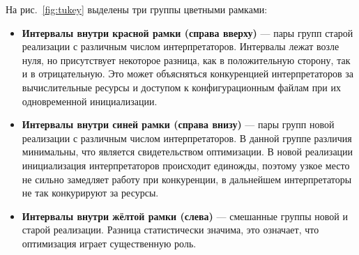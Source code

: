 На рис.~\ref{fig:tukey} выделены три группы цветными рамками:
\begin{itemize}
    \item \textbf{Интервалы внутри красной рамки (справа вверху)} ---
        пары групп старой реализации с различным числом интерпретаторов.
        Интервалы лежат возле нуля, но присутствует
        некоторое разница, как в положительную сторону,
        так и в отрицательную. Это может объясняться
        конкуренцией интерпретаторов
        за вычислительные ресурсы и доступом к конфигурационным файлам
        при их одновременной инициализации.
    \item \textbf{Интервалы внутри синей рамки (справа внизу)} ---
        пары групп новой реализации с различным числом интерпретаторов.
        В данной группе различия минимальны,
        что является свидетельством оптимизации.
        В новой реализации инициализация интерпретаторов
        происходит единожды, поэтому
        узкое место не сильно замедляет работу
        при конкуренции, в дальнейшем
        интерпретаторы не так конкурируют за ресурсы.
    \item \textbf{Интервалы внутри жёлтой рамки (слева)} ---
        смешанные группы новой и старой реализации.
        Разница статистически значима,
        это означает, что оптимизация играет существенную роль.
\end{itemize}

